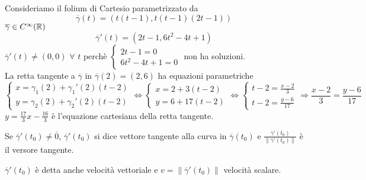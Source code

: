 \begin{exbar}
\begin{example}
	Consideriamo il folium di Cartesio parametrizzato da 
	\begin{equation*}
		\overline{\gamma}(t)=\left(t(t-1),t(t-1)(2t-1)\right)
	\end{equation*}
	$\overline{\gamma}\in C^\infty(\mathbb{R})$\\
	\begin{equation*}
		\overline{\gamma}' (t)=(2t-1,6t^2-4t+1)
	\end{equation*}
	$\overline{\gamma}' (t) \neq (0,0)\,\, \forall\,\, t$ perchè $\begin{cases}
		2t-1=0\\
		6t^2-4t+1=0
	\end{cases}$ non ha soluzioni.\\
	La retta tangente a $\overline{\gamma}$ in $\overline{\gamma}(2)=(2,6)$ ha equazioni parametriche
	\begin{equation*}
		\begin{cases}
			x=\gamma_1(2)+\gamma_1'(2)(t-2)\\
			y=\gamma_2(2)+\gamma_2'(2)(t-2)
		\end{cases}
		\Leftrightarrow \begin{cases}
			x=2+3(t-2)\\
			y=6+17(t-2)
		\end{cases} \Leftrightarrow\begin{cases}
			t-2=\frac{x-2}{3}\\
			t-2=\frac{y-6}{17}
		\end{cases}
		\Rightarrow \frac{x-2}{3}=\frac{y-6}{17}
	\end{equation*}
	$y=\frac{17}{3}x-\frac{16}{3}$ è l'equazione cartesiana della retta tangente.
\end{example}
\end{exbar}


\begin{definition}
	Se $\overline{\gamma}'(t_0)\neq \overline{0}$, $\overline{\gamma}'(t_0)$ si dice vettore tangente alla curva in $\overline{\gamma}(t_0)$ e $\frac{\overline{\gamma}'(t_0)}{\|\overline{\gamma}'(t_0)\|}$ è il versore tangente.
\end{definition}


\begin{definition}
		$\overline{\gamma}'(t_0)$ è detta anche velocità vettoriale e $v= \|\overline{\gamma}'(t_0)\|$ velocità scalare.
\end{definition}


